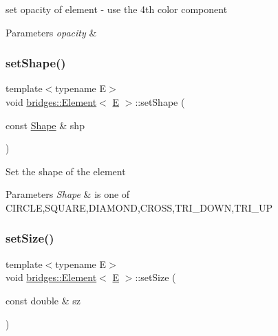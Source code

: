 set opacity of element -\/ use the 4th color component


\begin{DoxyParams}{Parameters}
{\em opacity} & \\
\hline
\end{DoxyParams}
\mbox{\label{classbridges_1_1_element_a6571144f18e101e5ae95ddc019b9732f}} 
\subsubsection{\texorpdfstring{setShape()}{setShape()}}
{\footnotesize\ttfamily template$<$typename E$>$ \\
void \mbox{\hyperlink{classbridges_1_1_element}{bridges\+::\+Element}}$<$ \mbox{\hyperlink{namespacebridges_acfb0a4f7877d8f63de3e6862004c50eda3a3ea00cfc35332cedf6e5e9a32e94da}{E}} $>$\+::set\+Shape (\begin{DoxyParamCaption}\item[{const \mbox{\hyperlink{namespacebridges_a1b4050586bd708782ae0d4f3b06b9579}{Shape}} \&}]{shp }\end{DoxyParamCaption})\hspace{0.3cm}{\ttfamily [inline]}}

Set the shape of the element


\begin{DoxyParams}{Parameters}
{\em Shape} & is one of C\+I\+R\+C\+LE,S\+Q\+U\+A\+RE,D\+I\+A\+M\+O\+ND,C\+R\+O\+SS,T\+R\+I\+\_\+\+D\+O\+WN,T\+R\+I\+\_\+\+UP \\
\hline
\end{DoxyParams}
\mbox{\label{classbridges_1_1_element_a8342cb6785b146f944701468ef094ea2}} 
\subsubsection{\texorpdfstring{setSize()}{setSize()}}
{\footnotesize\ttfamily template$<$typename E$>$ \\
void \mbox{\hyperlink{classbridges_1_1_element}{bridges\+::\+Element}}$<$ \mbox{\hyperlink{namespacebridges_acfb0a4f7877d8f63de3e6862004c50eda3a3ea00cfc35332cedf6e5e9a32e94da}{E}} $>$\+::set\+Size (\begin{DoxyParamCaption}\item[{const double \&}]{sz }\end{DoxyParamCaption})\hspace{0.3cm}{\ttfamily [inline]}}

